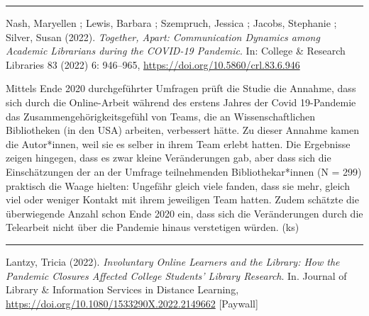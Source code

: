 \documentclass[a4paper,
fontsize=11pt,
oneside,
numbers=noperiodatend,
parskip=half-,
bibliography=totoc,
final
]{scrartcl}
\begin{document}
\begin{center}\rule{0.5\linewidth}{0.5pt}\end{center}

Nash, Maryellen ; Lewis, Barbara ; Szempruch, Jessica ; Jacobs,
Stephanie ; Silver, Susan (2022). \emph{Together, Apart: Communication
Dynamics among Academic Librarians during the COVID-19 Pandemic}. In:
College \& Research Libraries 83 (2022) 6: 946--965,
\url{https://doi.org/10.5860/crl.83.6.946}

Mittels Ende 2020 durchgeführter Umfragen prüft die Studie die Annahme,
dass sich durch die Online-Arbeit während des erstens Jahres der Covid
19-Pandemie das Zusammengehörigkeitsgefühl von Teams, die an
Wissenschaftlichen Bibliotheken (in den USA) arbeiten, verbessert hätte.
Zu dieser Annahme kamen die Autor*innen, weil sie es selber in ihrem
Team erlebt hatten. Die Ergebnisse zeigen hingegen, dass es zwar kleine
Veränderungen gab, aber dass sich die Einschätzungen der an der Umfrage
teilnehmenden Bibliothekar*innen (N = 299) praktisch die Waage hielten:
Ungefähr gleich viele fanden, dass sie mehr, gleich viel oder weniger
Kontakt mit ihrem jeweiligen Team hatten. Zudem schätzte die
überwiegende Anzahl schon Ende 2020 ein, dass sich die Veränderungen
durch die Telearbeit nicht über die Pandemie hinaus verstetigen würden.
(ks)

\begin{center}\rule{0.5\linewidth}{0.5pt}\end{center}

\pagebreak

Lantzy, Tricia (2022). \emph{Involuntary Online Learners and the
Library: How the Pandemic Closures Affected College Students' Library
Research}. In. Journal of Library \& Information Services in Distance
Learning, \url{https://doi.org/10.1080/1533290X.2022.2149662}
{[}Paywall{]}
\end{document}
